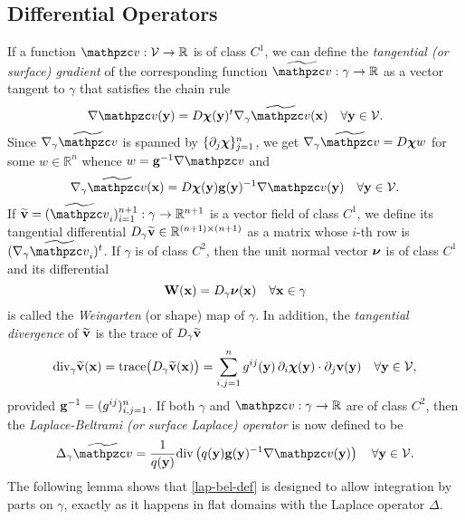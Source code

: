 \subsection{Differential Operators}\label{S:operators}
%
If a function $\tv:\mathcal{V}\to\mathbb{R}$ is of class $C^1$, we can define the
{\it tangential (or surface) gradient} of the corresponding function
$\widetilde \tv: \gamma\to\mathbb{R}$ as
a vector tangent to $\gamma$ that satisfies the chain rule
%
\begin{equation}\label{def-tang-grad}
\nabla \tv(\by) = D\bchi(\by)^t \nabla_\gamma \widetilde \tv(\bx)
\quad\forall \by\in\mathcal V.
\end{equation}
%
Since $\nabla_\gamma\widetilde \tv$ is spanned by $\{\partial_j{\boldsymbol \chi}\}_{j=1}^n$, we get
$\nabla_\gamma\widetilde \tv = D\bchi w$ for some $w \in \mathbb{R}^n$ whence $w = \bg^{-1} \nabla \tv$ and
%
\begin{equation}\label{e:exact_grad}
  \nabla_\gamma \widetilde \tv (\bx) = D\bchi(\by) \bg(\by)^{-1} \nabla \tv(\by)
  \quad\forall \by\in \mathcal V.
\end{equation}
%
If $\widetilde\bv=(\widetilde\tv_i)_{i=1}^{n+1}:\gamma\to\mathbb{R}^{n+1}$
is a vector field of class $C^1$, we define its tangential differential
$D_\gamma\widetilde{{\bf v}} \in \mathbb{R}^{(n+1)\times(n+1)}$ as a matrix whose $i$-th row is
$(\nabla_\gamma \widetilde\tv_i)^t$. If $\gamma$ is of class $C^2$, then the unit normal
vector ${\boldsymbol \nu}$ is of class $C^1$ and its differential
%
\begin{equation}\label{weingarten}
  {\bf W}({\bf x}) = D_\gamma {\boldsymbol \nu}({\bf x})
  \quad\forall {\bf x}\in\gamma
\end{equation}
%
is called the {\it Weingarten} (or shape) map of $\gamma$. In addition, the
{\it tangential divergence} of $\widetilde{{\bf v}}$ is the trace of $D_\gamma\widetilde{{\bf v}}$
%
\begin{equation}\label{tang-diver}
  \textrm{div}_\gamma \widetilde{{\bf v}}({\bf x})
  = \textrm{trace}\big( D_\gamma\widetilde{{\bf v}}({\bf x})  \big)
  = \sum_{i,j=1}^n g^{ij}({\bf y}) \, \partial_i{\boldsymbol \chi}({\bf y})\cdot\partial_j {\bf v}({\bf y})
  \quad\forall {\bf y}\in\mathcal{V},
\end{equation}  
%
provided ${\bf g}^{-1} = (g^{ij})_{i,j=1}^n$.
If both $\gamma$ and $\tv:\gamma\to\mathbb{R}$ are of class $C^2$, then
the {\it Laplace-Beltrami (or surface Laplace) operator} is now defined to be
%
\begin{equation}\label{lap-bel-def}
  \Delta_\gamma \widetilde \tv =
  \frac{1}{q(\by)} \div { q(\by) \bg(\by)^{-1}\nabla \tv(\by) }
  \quad\forall \by\in\mathcal V.
\end{equation}  
%
The following lemma shows that \eqref{lap-bel-def} is designed
to allow integration by parts on $\gamma$, exactly as it happens in flat
domains with the Laplace operator $\Delta$.

